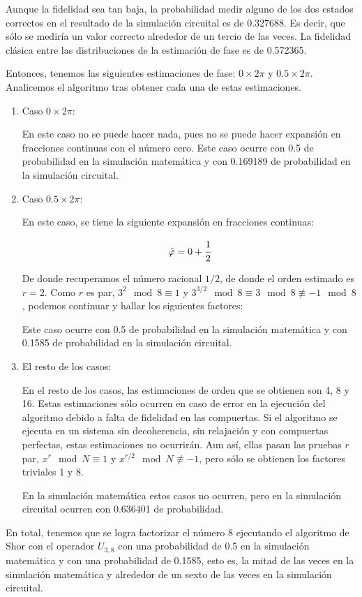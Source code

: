 Aunque la fidelidad sea tan baja, la probabilidad medir alguno de los dos estados correctos en el resultado de la simulación circuital es de 0.327688. Es decir, que sólo se mediría un valor correcto alrededor de un tercio de las veces. La fidelidad clásica entre las distribuciones de la estimación de fase es de 0.572365.

Entonces, tenemos las siguientes estimaciones de fase: $0 \times 2\pi$ y $0.5 \times 2\pi$. Analicemos el algoritmo tras obtener cada una de estas estimaciones.

\begin{enumerate}
    \item Caso $0 \times 2\pi$:

        En este caso no se puede hacer nada, pues no se puede hacer expansión en fracciones continuas con el número cero. Este caso ocurre con 0.5 de probabilidad en la simulación matemática y con 0.169189 de probabilidad en la simulación circuital.

    \item Caso $0.5 \times 2\pi$:

        En este caso, se tiene la siguiente expansión en fracciones continuas:

        \begin{equation}
            \tilde{\varphi} = 0 + \cfrac{1}{2}
        \end{equation}
        
        De donde recuperamos el número racional $1/2$, de donde el orden estimado es $r = 2$. Como $r$ es par, $3^{2}\mod 8 \equiv 1$ y $3^{3/2}\mod 8 \equiv 3\mod 8 \not\equiv -1\mod 8$, podemos continuar y hallar los siguientes factores:

        Este caso ocurre con 0.5 de probabilidad en la simulación matemática y con 0.1585 de probabilidad en la simulación circuital.

    \item El resto de los casos:

        En el resto de los casos, las estimaciones de orden que se obtienen son 4, 8 y 16. Estas estimaciones sólo ocurren en caso de error en la ejecución del algoritmo debido a falta de fidelidad en las compuertas. Si el algoritmo se ejecuta en un sistema sin decoherencia, sin relajación y con compuertas perfectas, estas estimaciones no ocurrirán. Aun así, ellas pasan las pruebas $r$ par, $x^r \mod N \equiv 1$ y $x^{r/2} \mod N \not\equiv -1$, pero sólo se obtienen los factores triviales 1 y 8.

        En la simulación matemática estos casos no ocurren, pero en la simulación circuital ocurren con 0.636401 de probabilidad.
\end{enumerate}

En total, tenemos que se logra factorizar el número 8 ejecutando el algoritmo de Shor con el operador $U_{3,8}$ con una probabilidad de 0.5 en la simulación matemática y con una probabilidad de 0.1585, esto es, la mitad de las veces en la simulación matemática y alrededor de un sexto de las veces en la simulación circuital.

